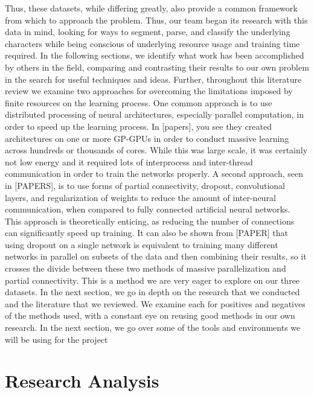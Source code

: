 \documentclass[12pt]{article}  %
\begin{document}
Thus, these datasets, while differing greatly, also provide a common framework from which to approach the problem.  Thus, our team began its research with this data in mind, looking for ways to segment, parse, and classify the underlying characters while being conscious of underlying resource usage and training time required. In the following sections, we identify what work has been accomplished by others in the field, comparing and contrasting their results to our own problem in the search for useful techniques and ideas. Further, throughout this literature review we examine two approaches for overcoming the limitations imposed by finite resources on the learning process.  One common approach is to use distributed processing of neural architectures, especially parallel computation, in order to speed up the learning process. In [papers], you see they created architectures on one or more GP-GPUs in order to conduct massive learning across hundreds or thousands of cores. While this was large scale, it was certainly not low energy and it required lots of interprocess and inter-thread communication in order to train the networks properly. A second approach, seen in [PAPERS], is to use forms of partial connectivity, dropout, convolutional layers, and regularization of weights to reduce the amount of inter-neural communication, when compared to fully connected artificial neural networks. This approach is theoretically enticing, as reducing the number of connections can significantly speed up training. It can also be shown from [PAPER] that using dropout on a single network is equivalent to training many different networks in parallel on subsets of the data and then combining their results, so it crosses the divide between these two methods of massive parallelization and partial connectivity. This is a method we are very eager to explore on our three datasets.
In the next section, we go in depth on the research that we conducted and the literature that we reviewed. We examine each for positives and negatives of the methods used, with a constant eye on reusing good methods in our own research. In the next section, we go over some of the tools and environments we will be using for the project


\section{Research Analysis}
\label{Research Analysis}
\end{document}
